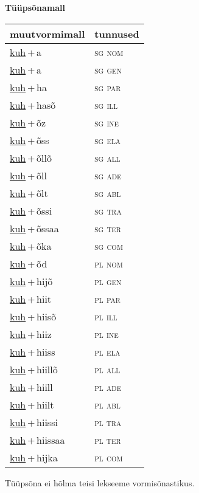 
\vspace{1.8em}
\begin{minipage}{\textwidth}
\textbf{Tüüpsõnamall \,}\\

\begin{sideways}
\begin{tabular}{l l}
muutvormimall & tunnused \\
\hline
\underline{kuh}\,+\,a & \textsc{ sg nom } \\
\underline{kuh}\,+\,a & \textsc{ sg gen } \\
\underline{kuh}\,+\,ha & \textsc{ sg par } \\
\underline{kuh}\,+\,hasõ & \textsc{ sg ill } \\
\underline{kuh}\,+\,õz & \textsc{ sg ine } \\
\underline{kuh}\,+\,õss & \textsc{ sg ela } \\
\underline{kuh}\,+\,õllõ & \textsc{ sg all } \\
\underline{kuh}\,+\,õll & \textsc{ sg ade } \\
\underline{kuh}\,+\,õlt & \textsc{ sg abl } \\
\underline{kuh}\,+\,õssi & \textsc{ sg tra } \\
\underline{kuh}\,+\,õssaa & \textsc{ sg ter } \\
\underline{kuh}\,+\,õka & \textsc{ sg com } \\
\underline{kuh}\,+\,õd & \textsc{ pl nom } \\
\underline{kuh}\,+\,hijõ & \textsc{ pl gen } \\
\underline{kuh}\,+\,hiit & \textsc{ pl par } \\
\underline{kuh}\,+\,hiisõ & \textsc{ pl ill } \\
\underline{kuh}\,+\,hiiz & \textsc{ pl ine } \\
\underline{kuh}\,+\,hiiss & \textsc{ pl ela } \\
\underline{kuh}\,+\,hiillõ & \textsc{ pl all } \\
\underline{kuh}\,+\,hiill & \textsc{ pl ade } \\
\underline{kuh}\,+\,hiilt & \textsc{ pl abl } \\
\underline{kuh}\,+\,hiissi & \textsc{ pl tra } \\
\underline{kuh}\,+\,hiissaa & \textsc{ pl ter } \\
\underline{kuh}\,+\,hijka & \textsc{ pl com } \\
\end{tabular}
\end{sideways}
\label{tab:tüüpsõnamall-kuha}

\end{minipage}

 
\vspace{1em}
\noindent Tüüpsõna ei hõlma teisi lekseeme vormi\-sõnastikus.
